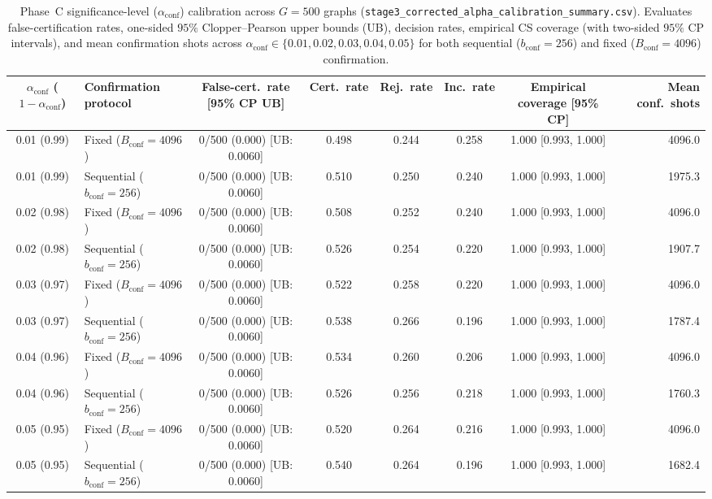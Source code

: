 \begin{table}[htbp]
\caption{Phase~C significance-level ($\alpha_{\mathrm{conf}}$) calibration across $G=500$ graphs (\texttt{stage3\_corrected\_alpha\_calibration\_summary.csv}). Evaluates false-certification rates, one-sided $95\%$ Clopper--Pearson upper bounds (UB), decision rates, empirical CS coverage (with two-sided $95\%$ CP intervals), and mean confirmation shots across $\alpha_{\mathrm{conf}} \in \{0.01, 0.02, 0.03, 0.04, 0.05\}$ for both sequential ($b_{\mathrm{conf}}=256$) and fixed ($B_{\mathrm{conf}}=4096$) confirmation.}
\label{tab:alpha_calibration}
\centering
\footnotesize
\begin{tabular}{@{}c l c c c c c r@{}}
\toprule
$\alpha_{\mathrm{conf}}$ ($1-\alpha_{\mathrm{conf}}$) & Confirmation protocol & False-cert.\ rate [95\% CP UB] & Cert.\ rate & Rej.\ rate & Inc.\ rate & Empirical coverage [95\% CP] & Mean conf.\ shots \\
\midrule
0.01 (0.99) & Fixed ($B_{\mathrm{conf}}=4096$) & 0/500 (0.000) [UB: 0.0060] & 0.498 & 0.244 & 0.258 & 1.000 [0.993, 1.000] & 4096.0 \\
0.01 (0.99) & Sequential ($b_{\mathrm{conf}}=256$) & 0/500 (0.000) [UB: 0.0060] & 0.510 & 0.250 & 0.240 & 1.000 [0.993, 1.000] & 1975.3 \\
0.02 (0.98) & Fixed ($B_{\mathrm{conf}}=4096$) & 0/500 (0.000) [UB: 0.0060] & 0.508 & 0.252 & 0.240 & 1.000 [0.993, 1.000] & 4096.0 \\
0.02 (0.98) & Sequential ($b_{\mathrm{conf}}=256$) & 0/500 (0.000) [UB: 0.0060] & 0.526 & 0.254 & 0.220 & 1.000 [0.993, 1.000] & 1907.7 \\
0.03 (0.97) & Fixed ($B_{\mathrm{conf}}=4096$) & 0/500 (0.000) [UB: 0.0060] & 0.522 & 0.258 & 0.220 & 1.000 [0.993, 1.000] & 4096.0 \\
0.03 (0.97) & Sequential ($b_{\mathrm{conf}}=256$) & 0/500 (0.000) [UB: 0.0060] & 0.538 & 0.266 & 0.196 & 1.000 [0.993, 1.000] & 1787.4 \\
0.04 (0.96) & Fixed ($B_{\mathrm{conf}}=4096$) & 0/500 (0.000) [UB: 0.0060] & 0.534 & 0.260 & 0.206 & 1.000 [0.993, 1.000] & 4096.0 \\
0.04 (0.96) & Sequential ($b_{\mathrm{conf}}=256$) & 0/500 (0.000) [UB: 0.0060] & 0.526 & 0.256 & 0.218 & 1.000 [0.993, 1.000] & 1760.3 \\
0.05 (0.95) & Fixed ($B_{\mathrm{conf}}=4096$) & 0/500 (0.000) [UB: 0.0060] & 0.520 & 0.264 & 0.216 & 1.000 [0.993, 1.000] & 4096.0 \\
0.05 (0.95) & Sequential ($b_{\mathrm{conf}}=256$) & 0/500 (0.000) [UB: 0.0060] & 0.540 & 0.264 & 0.196 & 1.000 [0.993, 1.000] & 1682.4 \\
\bottomrule
\end{tabular}
\end{table}
